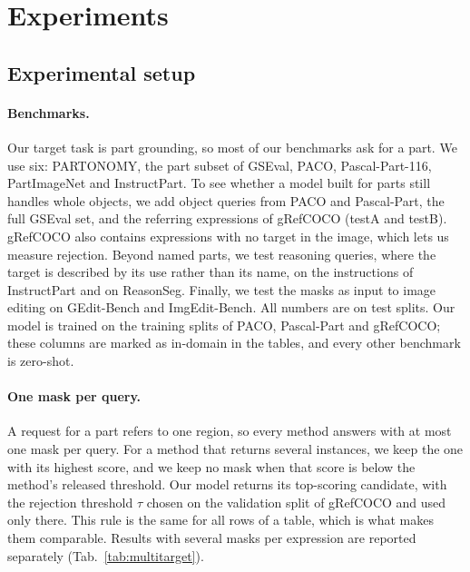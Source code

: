 \section{Experiments}
\label{sec:experiments}

\subsection{Experimental setup}
\label{sec:setup}

\paragraph{Benchmarks.}
Our target task is part grounding, so most of our benchmarks ask for a part. We use six: PARTONOMY, the part
subset of GSEval, PACO, Pascal-Part-116, PartImageNet and InstructPart. To see whether a model built for parts
still handles whole objects, we add object queries from PACO and Pascal-Part, the full GSEval set, and the
referring expressions of gRefCOCO (testA and testB). gRefCOCO also contains expressions with no target in the
image, which lets us measure rejection. Beyond named parts, we test reasoning queries, where the target is
described by its use rather than its name, on the instructions of InstructPart and on ReasonSeg. Finally, we test
the masks as input to image editing on GEdit-Bench and ImgEdit-Bench. All numbers are on test splits. Our model is
trained on the training splits of PACO, Pascal-Part and gRefCOCO; these columns are marked as in-domain in the
tables, and every other benchmark is zero-shot.

\paragraph{One mask per query.}
A request for a part refers to one region, so every method answers with at most one mask per query. For a method
that returns several instances, we keep the one with its highest score, and we keep no mask when that score is
below the method's released threshold. Our model returns its top-scoring candidate, with the rejection threshold
$\tau$ chosen on the validation split of gRefCOCO and used only there. This rule is the same for all rows of a
table, which is what makes them comparable. Results with several masks per expression are reported separately
(Tab.~\ref{tab:multitarget}).

